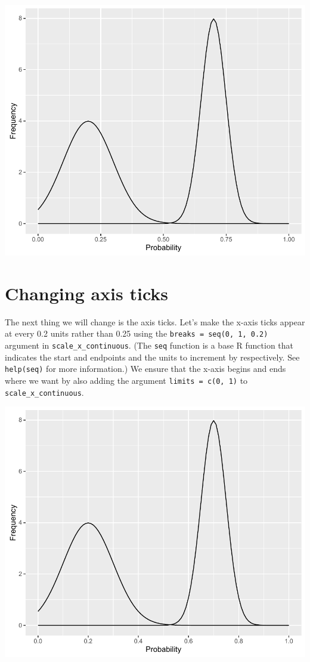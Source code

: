 \begin{center}\includegraphics[width=0.6\linewidth]{9_Function_Plots_pdf/function_5-1} \end{center}

\section{Changing axis ticks}\label{changing-axis-ticks}

The next thing we will change is the axis ticks. Let's make the x-axis
ticks appear at every 0.2 units rather than 0.25 using the
\texttt{breaks\ =\ seq(0,\ 1,\ 0.2)} argument in
\texttt{scale\_x\_continuous}. (The \texttt{seq} function is a base R
function that indicates the start and endpoints and the units to
increment by respectively. See \texttt{help(seq)} for more information.)
We ensure that the x-axis begins and ends where we want by also adding
the argument \texttt{limits\ =\ c(0,\ 1)} to
\texttt{scale\_x\_continuous}.

\begin{Shaded}
\begin{Highlighting}[]
\StringTok{ }\StringTok{ }\NormalTok{(} \NormalTok{,}
     \NormalTok{(}\NormalTok{, }\NormalTok{, }\NormalTok{), }\NormalTok{(}\NormalTok{, }\NormalTok{)) +}
\StringTok{  }\NormalTok{(} \NormalTok{)}
\end{Highlighting}
\end{Shaded}

\begin{center}\includegraphics[width=0.6\linewidth]{9_Function_Plots_pdf/function_6-1} \end{center}

